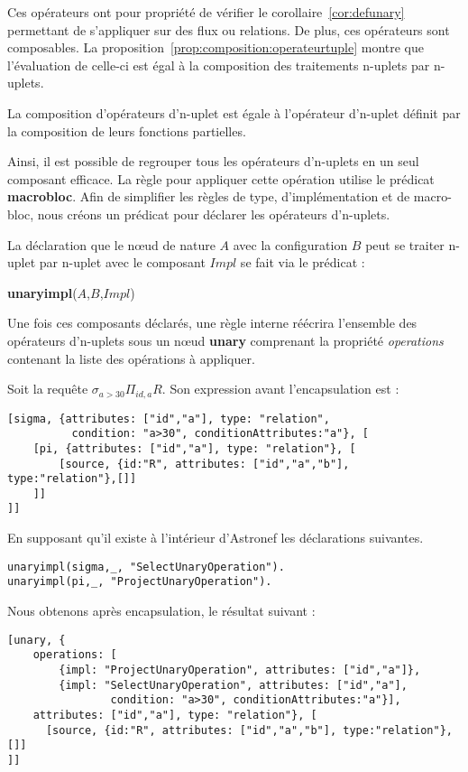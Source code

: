 Ces opérateurs ont pour propriété de vérifier le corollaire~\ref{cor:defunary} permettant de s'appliquer sur des flux ou relations. De plus, ces opérateurs sont composables. La proposition~\ref{prop:composition:operateurtuple} montre que l'évaluation de celle-ci est égal à la composition des traitements n-uplets par n-uplets.
\begin{prop}\label{prop:composition:operateurtuple}
    La composition d'opérateurs d'n-uplet est égale à l'opérateur d'n-uplet définit par la composition de leurs fonctions partielles.
\end{prop}

Ainsi, il est possible de regrouper tous les opérateurs d'n-uplets en un seul composant efficace. La règle pour appliquer cette opération utilise le prédicat \textbf{macrobloc}. Afin de simplifier les règles de type, d'implémentation et de macro-bloc, nous créons un prédicat pour déclarer les opérateurs d'n-uplets.
\begin{regle}
La déclaration que le nœud de nature $A$ avec la configuration $B$ peut se traiter n-uplet par n-uplet avec le composant $Impl$ se fait via le prédicat :
\begin{center}\textbf{unaryimpl}($A$,$B$,$Impl$)\end{center}
\end{regle}

Une fois ces composants déclarés, une règle interne réécrira l'ensemble des opérateurs d'n-uplets sous un nœud \textbf{unary} comprenant la propriété \textit{operations} contenant la liste des opérations à appliquer.
\begin{example}
Soit la requête $\sigma_{a > 30}\Pi_{id,a} R$. Son expression avant l'encapsulation est :
\begin{lstlisting}
[sigma, {attributes: ["id","a"], type: "relation", 
		  condition: "a>30", conditionAttributes:"a"}, [
	[pi, {attributes: ["id","a"], type: "relation"}, [
		[source, {id:"R", attributes: ["id","a","b"], type:"relation"},[]]
	]]
]]
\end{lstlisting}

En supposant qu'il existe à l'intérieur d'Astronef les déclarations suivantes.
\begin{lstlisting}
unaryimpl(sigma,_, "SelectUnaryOperation").
unaryimpl(pi,_, "ProjectUnaryOperation").
\end{lstlisting}

Nous obtenons après encapsulation, le résultat suivant :
\begin{lstlisting}
[unary, {
	operations: [
		{impl: "ProjectUnaryOperation", attributes: ["id","a"]},
		{impl: "SelectUnaryOperation", attributes: ["id","a"], 
				condition: "a>30", conditionAttributes:"a"}], 
	attributes: ["id","a"], type: "relation"}, [
	  [source, {id:"R", attributes: ["id","a","b"], type:"relation"},[]]
]]
\end{lstlisting}
\end{example}


